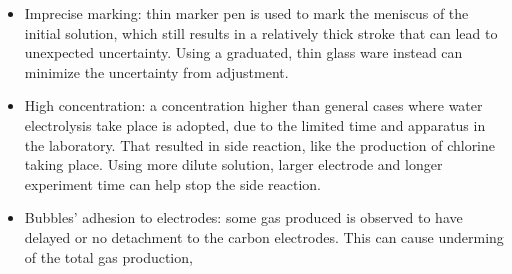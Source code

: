 \documentclass[a4paper]{article}
\begin{document}
\begin{itemize}
    \item Imprecise marking: thin marker pen is used to mark the meniscus of the initial solution, which still results in a relatively thick stroke that can lead to unexpected uncertainty. Using a graduated, thin glass ware instead can minimize the uncertainty from adjustment.
    \item High concentration: a concentration higher than general cases where water electrolysis take place is adopted, due to the limited time and apparatus in the laboratory. That resulted in side reaction, like the production of chlorine taking place. Using more dilute solution, larger electrode and longer experiment time can help stop the side reaction.
    \item Bubbles' adhesion to electrodes: some gas produced is observed to have delayed or no detachment to the carbon electrodes. This can cause underming of the total gas production, 
\end{itemize}



\end{document}
